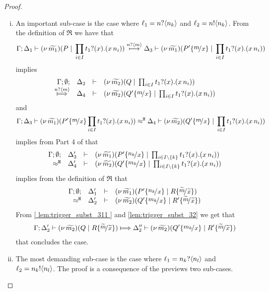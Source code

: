 \begin{proof}
\begin{enumerate}
\begin{enumerate}[i.]
					\item	An important sub-case is the case where
							$\ell_1 = n ? \langle n_k \rangle$ and $\ell_2 = n ! \langle n_k \rangle$.
							From the definition of $\Re$ we have that
							\[
								\horel{\Gamma}{\Delta_1}{ \newsp{\widetilde{m_1}}{P \Par \prod_{i \in I} \binp{t_1}{x} (\appl{x}{n_i})}}
								{ \hby{ \bactinp{n}{m} } }
								{\Delta_3}{  \newsp{\widetilde{m_1}}{P' \subst{m}{x} \Par \prod_{i \in I} \binp{t_1}{x} (\appl{x}{n_i})}   }
							\]
							implies 
							\begin{eqnarray}
								\mhorel{\Gamma}{\Delta_2}{ \newsp{\widetilde{m_2}}{Q \Par \prod_{i \in I} \binp{t_1}{x} (\appl{x}{n_i})}}
								{ \Hby{ \bactinp{n}{m} } }
								{\Delta_4}{}{  \newsp{\widetilde{m_2}}{Q' \subst{m}{x} \Par \prod_{i \in I} \binp{t_1}{x} (\appl{x}{n_i})}   }
								\label{ lem:trigger_subst_311 }
							\end{eqnarray}
							and
							\[
								\horel{\Gamma}{\Delta_3}{  \newsp{\widetilde{m_1}}{P' \subst{m}{x} \prod_{i \in I} \binp{t_1}{x} (\appl{x}{n_i})}   }
								{\hwb}
								{\Delta_4}{  \newsp{\widetilde{m_2}}{Q' \subst{m}{x} \Par \prod_{i \in I} \binp{t_1}{x} (\appl{x}{n_i})}   }
							\]
							implies from Part 4 of  that
							\[
								\mhorel{\Gamma}{\Delta_3'}{  \newsp{\widetilde{m_1}}{P' \subst{n_k}{x} \Par \prod_{i \in I\backslash\set{k}} \binp{t_1}{x}(\appl{x}{n_i})}   }
								{\hwb}
								{\Delta_4'}{}{  \newsp{\widetilde{m_2}}{Q' \subst{m_k}{x} \Par \prod_{i \in I\backslash\set{k}} \binp{t_1}{x}(\appl{x}{n_i})}   }
							\]
							implies from the definition of $\Re$ that
							\[
								\mhorel{\Gamma}{\Delta_1'}{\newsp{\widetilde{m_1}}{P' \subst{n_k}{x} \Par R \subst{\widetilde{m}}{\widetilde{x}}}}
								{\hwb}
								{\Delta_2'}{}{  \newsp{\widetilde{m_2}}{Q' \subst{m_k}{x} \Par R' \subst{\widetilde{m}}{\widetilde{x}} } }
							\]
							From \eqref{ lem:trigger_subst_311 } and \eqref{lem:trigger_subst_32} we get that
							\begin{eqnarray*}
								\horel{\Gamma}{\Delta_2'}{ \newsp{\widetilde{m_2}}{Q \Par R \subst{\widetilde{m}}{\widetilde{x}} }}
								{ \Hby{  } }
								{\Delta_2''}{  \newsp{\widetilde{m_2}}{Q' \subst{m_k}{x} \Par R' \subst{\widetilde{m}}{\widetilde{x}} }   }
							\end{eqnarray*}
							that concludes the case.

					\item	The most demanding sub-case is the case
							where
							$\ell_1 = n_k ? \langle n_l \rangle$ and $\ell_2 = n_k ! \langle n_l \rangle$.
							The proof is a consequence of the previews two sub-cases.	



\end{enumerate}
\end{enumerate}
\end{proof}
